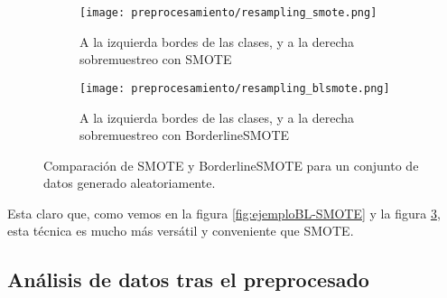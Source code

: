 \begin{figure}[H]
    \centering
	 \begin{subfigure}[b]{\textwidth}
		 \centering
		 \texttt{[image: preprocesamiento/resampling\_smote.png]}
		 \caption{A la izquierda bordes de las clases, y a la derecha sobremuestreo con SMOTE}
		 \label{fig:SMOTE-cmp}
	 \end{subfigure}

    \begin{subfigure}[b]{\textwidth}
		 \centering
		  \texttt{[image: preprocesamiento/resampling\_blsmote.png]}
        \caption{A la izquierda bordes de las clases, y a la derecha sobremuestreo con BorderlineSMOTE}
        \label{fig:BLSMOTE-cmp}
    \end{subfigure}

    \caption{Comparación de SMOTE y BorderlineSMOTE para un conjunto de datos generado aleatoriamente.}\label{fig:BLSMOTE-SMOTE}

\end{figure}

Esta claro que, como vemos en la figura \ref{fig:ejemploBL-SMOTE} y la figura \ref{fig:BLSMOTE-SMOTE}, esta técnica es mucho más versátil y conveniente que SMOTE.



\subsection{Análisis de datos tras el preprocesado}



\newpage
